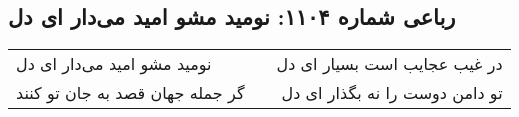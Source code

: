 \begin{center}
\section*{رباعی شماره ۱۱۰۴: نومید مشو امید می‌دار ای دل}
\label{sec:1104}
\begin{longtable}{l p{0.5cm} r}
نومید مشو امید می‌دار ای دل
&&
در غیب عجایب است بسیار ای دل
\\
گر جمله جهان قصد به جان تو کنند
&&
تو دامن دوست را نه بگذار ای دل
\\
\end{longtable}
\end{center}
